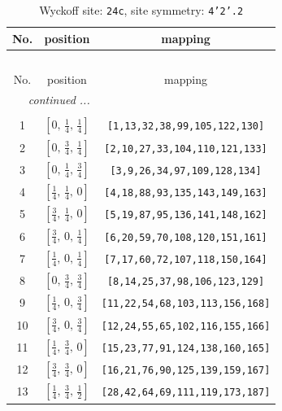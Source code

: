 \documentclass[fleqn,8pt]{jsarticle}
\begin{document}
\begin{longtable}{ccc}
\caption{Wyckoff site: {\tt 24c}, site symmetry: {\tt 4'2'.2}}
 \\
 \hline \hline
No. & position & mapping \\ \hline \endfirsthead

\multicolumn{2}{l}{\tablename\ \thetable{}} \\
 \hline \hline
No. & position & mapping \\ \hline \endhead

 \hline \hline
\multicolumn{2}{r}{\footnotesize\it continued ...} \\ \endfoot

 \hline \hline
\multicolumn{2}{r}{} \\ \endlastfoot

1 & $\left[ 0,\, \frac{1}{4},\, \frac{1}{4} \right]$ & {\tt [1,13,32,38,99,105,122,130]} \\ \hline
2 & $\left[ 0,\, \frac{3}{4},\, \frac{1}{4} \right]$ & {\tt [2,10,27,33,104,110,121,133]} \\ \hline
3 & $\left[ 0,\, \frac{1}{4},\, \frac{3}{4} \right]$ & {\tt [3,9,26,34,97,109,128,134]} \\ \hline
4 & $\left[ \frac{1}{4},\, \frac{1}{4},\, 0 \right]$ & {\tt [4,18,88,93,135,143,149,163]} \\ \hline
5 & $\left[ \frac{3}{4},\, \frac{1}{4},\, 0 \right]$ & {\tt [5,19,87,95,136,141,148,162]} \\ \hline
6 & $\left[ \frac{3}{4},\, 0,\, \frac{1}{4} \right]$ & {\tt [6,20,59,70,108,120,151,161]} \\ \hline
7 & $\left[ \frac{1}{4},\, 0,\, \frac{1}{4} \right]$ & {\tt [7,17,60,72,107,118,150,164]} \\ \hline
8 & $\left[ 0,\, \frac{3}{4},\, \frac{3}{4} \right]$ & {\tt [8,14,25,37,98,106,123,129]} \\ \hline
9 & $\left[ \frac{1}{4},\, 0,\, \frac{3}{4} \right]$ & {\tt [11,22,54,68,103,113,156,168]} \\ \hline
10 & $\left[ \frac{3}{4},\, 0,\, \frac{3}{4} \right]$ & {\tt [12,24,55,65,102,116,155,166]} \\ \hline
11 & $\left[ \frac{1}{4},\, \frac{3}{4},\, 0 \right]$ & {\tt [15,23,77,91,124,138,160,165]} \\ \hline
12 & $\left[ \frac{3}{4},\, \frac{3}{4},\, 0 \right]$ & {\tt [16,21,76,90,125,139,159,167]} \\ \hline
13 & $\left[ \frac{1}{4},\, \frac{3}{4},\, \frac{1}{2} \right]$ & {\tt [28,42,64,69,111,119,173,187]} \\ \hline

\end{longtable}
\end{document}
